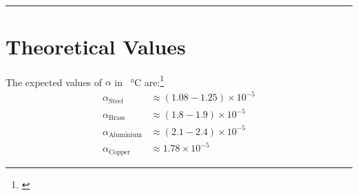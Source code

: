 \documentclass[%
 sor,
 jor,
 amsmath,amssymb,
 reprint,
]{revtex4-2}
\begin{document}


\vspace{1cm}

\noindent{}\\

\noindent\rule{\linewidth}{0.4pt}
\hfill
\appendix
\section{Theoretical Values}
The expected values of $\alpha$ in \si{\per\celsius} are:\footnote{\cite{alpha}}
\[
\begin{split}
\alpha_{\text{Steel}} &\approx (1.08 - 1.25) \times 10^{-5}\\
\alpha_{\text{Brass}} &\approx (1.8 - 1.9) \times 10^{-5}\\
\alpha_{\text{Aluminium}} &\approx (2.1 - 2.4) \times 10^{-5}\\
\alpha_{\text{Copper}} &\approx 1.78 \times 10^{-5}
\end{split}
\]


\end{document}
